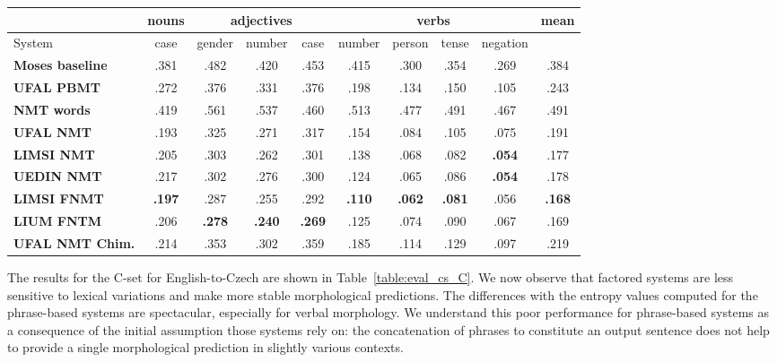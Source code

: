\documentclass[11pt,letterpaper,final,nohyperref]{article}
\begin{document}
\begin{table*}[tb] %
\begin{center}
\small
\begin{tabular}{ l|c|ccc|cccc||c } 
\hline
& \multicolumn{1}{c}{\textbf{nouns}} & \multicolumn{3}{c}{\textbf{adjectives}} & \multicolumn{4}{c}{\textbf{verbs}} & \multicolumn{1}{c}{\textbf{mean}} \\
\hline
System & case & gender & number & case & number & person & tense & negation & \\
\hline
\textbf{Moses baseline}  & .381 & .482 & .420 & .453 & .415 & .300 & .354 & .269 & .384 \\ 
\textbf{UFAL PBMT}       & .272 & .376 & .331 & .376 & .198 & .134 & .150 & .105 & .243 \\ 
\textbf{NMT words}       & .419 & .561 & .537 & .460 & .513 & .477 & .491 & .467 & .491 \\ 
\textbf{UFAL NMT}        & .193 & .325 & .271 & .317 & .154 & .084 & .105 & .075 & .191 \\ 
\textbf{LIMSI NMT}       & .205 & .303 & .262 & .301 & .138 & .068 & .082 & \textbf{.054} & .177 \\ 
\textbf{UEDIN NMT}       & .217 & .302 & .276 & .300 & .124 & .065 & .086 & \textbf{.054} & .178 \\ 
\textbf{LIMSI FNMT}      & \textbf{.197} & .287 & .255 & .292 & \textbf{.110} & \textbf{.062} & \textbf{.081} & .056 & \textbf{.168} \\
\textbf{LIUM FNTM}       & .206 & \textbf{.278} & \textbf{.240} & \textbf{.269} & .125 & .074 & .090 & .067 & .169 \\ 
\textbf{UFAL NMT Chim.}  & .214 & .353 & .302 & .359 & .185 & .114 & .129 & .097 & .219 \\ 
\hline
 \end{tabular} 
\caption{\label{table:eval_cs_C} Sentence group evaluation for English-to-Czech with Entropy (C-set).}
\end{center}
\end{table*}

The results for the C-set for English-to-Czech are
shown in Table~\ref{table:eval_cs_C}.
We now observe that factored systems are less
sensitive to lexical variations and make more
stable morphological predictions. The differences
with the entropy values computed for the phrase-based
systems are spectacular, especially for verbal
morphology. We understand this poor performance
for phrase-based systems as a consequence of the
initial assumption those systems rely on: the 
concatenation of phrases to constitute an output
sentence does not help to provide a single morphological
prediction in slightly various contexts.
\end{document}
